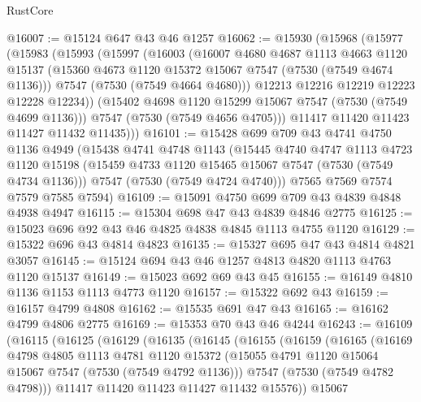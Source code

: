 \begin{lexlean}{RustCore}
\begin{coremodule}
@16007 := @15124 @647 @43 @46 @1257
@16062 := @15930
    (@15968
      (@15977
        (@15983
          (@15993
            (@15997
              (@16003
                (@16007
                  @4680
                  @4687
                  @1113
                  @4663
                  @1120
                  @15137
                  (@15360 @4673 @1120 @15372 @15067 @7547 (@7530 (@7549 @4674 @1136)))
                  @7547
                  (@7530 (@7549 @4664 @4680)))
                @12213
                @12216
                @12219
                @12223
                @12228
                @12234))
            (@15402 @4698 @1120 @15299 @15067 @7547 (@7530 (@7549 @4699 @1136)))
            @7547
            (@7530 (@7549 @4656 @4705)))
          @11417
          @11420
          @11423
          @11427
          @11432
          @11435)))
@16101 := @15428
    @699
    @709
    @43
    @4741
    @4750
    @1136
    @4949
    (@15438
      @4741
      @4748
      @1143
      (@15445
        @4740
        @4747
        @1113
        @4723
        @1120
        @15198
        (@15459 @4733 @1120 @15465 @15067 @7547 (@7530 (@7549 @4734 @1136)))
        @7547
        (@7530 (@7549 @4724 @4740)))
      @7565
      @7569
      @7574
      @7579
      @7585
      @7594)
@16109 := @15091 @4750 @699 @709 @43 @4839 @4848 @4938 @4947
@16115 := @15304 @698 @47 @43 @4839 @4846 @2775
@16125 := @15023 @696 @92 @43 @46 @4825 @4838 @4845 @1113 @4755 @1120
@16129 := @15322 @696 @43 @4814 @4823
@16135 := @15327 @695 @47 @43 @4814 @4821 @3057
@16145 := @15124 @694 @43 @46 @1257 @4813 @4820 @1113 @4763 @1120 @15137
@16149 := @15023 @692 @69 @43 @45
@16155 := @16149 @4810 @1136 @1153 @1113 @4773 @1120
@16157 := @15322 @692 @43
@16159 := @16157 @4799 @4808
@16162 := @15535 @691 @47 @43
@16165 := @16162 @4799 @4806 @2775
@16169 := @15353 @70 @43 @46 @4244
@16243 := @16109
    (@16115
      (@16125
        (@16129
          (@16135
            (@16145
              (@16155
                (@16159
                  (@16165
                    (@16169
                      @4798
                      @4805
                      @1113
                      @4781
                      @1120
                      @15372
                      (@15055 @4791 @1120 @15064 @15067 @7547 (@7530 (@7549 @4792 @1136)))
                      @7547
                      (@7530 (@7549 @4782 @4798)))
                    @11417
                    @11420
                    @11423
                    @11427
                    @11432
                    @15576))
                @15067

\end{coremodule}
\end{lexlean}

